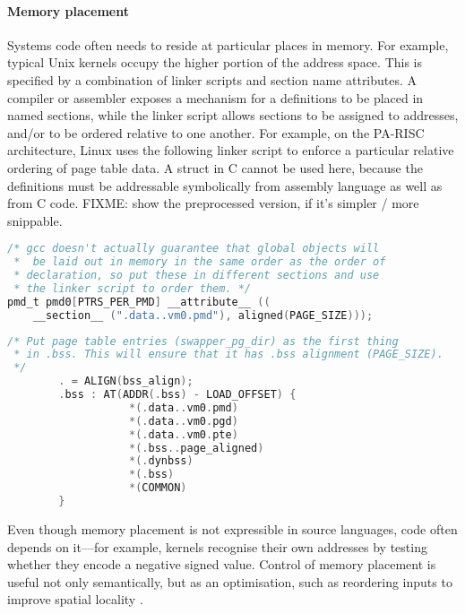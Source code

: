 \paragraph{Memory placement}
Systems code often needs to reside at particular places in memory.
For example, typical Unix kernels occupy the higher portion of the address space.
This is specified by a combination of linker scripts and section name attributes. 
A compiler or assembler exposes a mechanism for a definitions to be placed in named sections,
while the linker script allows sections to be assigned to addresses, 
and/or to be ordered relative to one another.
For example, on the PA-RISC architecture, Linux uses the following 
linker script to enforce a particular relative ordering of page table data.
A struct in C cannot be used here, because the definitions must be addressable
symbolically from assembly language as well as from C code.
FIXME: show the preprocessed version, if it's simpler / more snippable.

{\scriptsize\begin{lstlisting}[language=C,columns=flexible,basicstyle=\sffamily]
/* gcc doesn't actually guarantee that global objects will
 *  be laid out in memory in the same order as the order of 
 * declaration, so put these in different sections and use
 * the linker script to order them. */
pmd_t pmd0[PTRS_PER_PMD] __attribute__ ((
    __section__ (".data..vm0.pmd"), aligned(PAGE_SIZE)));
\end{lstlisting}}

{\scriptsize\begin{lstlisting}[language=C,columns=flexible,basicstyle=\sffamily]
/* Put page table entries (swapper_pg_dir) as the first thing 
 * in .bss. This will ensure that it has .bss alignment (PAGE_SIZE).
 */
        . = ALIGN(bss_align);                
        .bss : AT(ADDR(.bss) - LOAD_OFFSET) {
                   *(.data..vm0.pmd)
                   *(.data..vm0.pgd)
                   *(.data..vm0.pte)
                   *(.bss..page_aligned)     
                   *(.dynbss)                
                   *(.bss)                   
                   *(COMMON)                 
        }
\end{lstlisting}}

Even though memory placement is not expressible in source languages, 
code often depends on it---for example, kernels recognise their own addresses
by testing whether they encode a negative signed value.
Control of memory placement is useful not only semantically, 
but as an optimisation, such as 
reordering inputs to improve spatial locality \citep{orr_dynamic_1994}.

